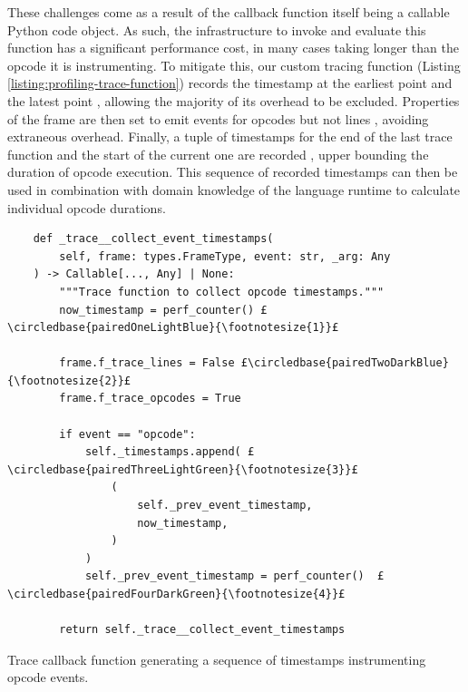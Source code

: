 These challenges come as a result of the callback function itself being a callable Python code object.
As such, the infrastructure to invoke and evaluate this function has a significant performance cost, in many cases taking longer than the opcode it is instrumenting. To mitigate this, our custom tracing function (Listing \ref{listing:profiling-trace-function}) records the timestamp at the earliest point  and the latest point , allowing the majority of its overhead to be excluded. Properties of the frame are then set to emit events for opcodes but not lines , avoiding extraneous overhead. Finally, a tuple of timestamps for the end of the last trace function and the start of the current one are recorded , upper bounding the duration of opcode execution.
This sequence of recorded timestamps can then be used in combination with domain knowledge of the language runtime to calculate individual opcode durations.

\begin{listing}[H]
    \centering
    \begin{verbatim}
    def _trace__collect_event_timestamps(
        self, frame: types.FrameType, event: str, _arg: Any
    ) -> Callable[..., Any] | None:
        """Trace function to collect opcode timestamps."""
        now_timestamp = perf_counter() £\circledbase{pairedOneLightBlue}{\footnotesize{1}}£

        frame.f_trace_lines = False £\circledbase{pairedTwoDarkBlue}{\footnotesize{2}}£
        frame.f_trace_opcodes = True

        if event == "opcode":
            self._timestamps.append( £\circledbase{pairedThreeLightGreen}{\footnotesize{3}}£
                (
                    self._prev_event_timestamp,
                    now_timestamp,
                )
            )
            self._prev_event_timestamp = perf_counter()  £\circledbase{pairedFourDarkGreen}{\footnotesize{4}}£

        return self._trace__collect_event_timestamps
    \end{verbatim}
    \vspace{1em}
    \caption{Trace callback function generating a sequence of timestamps instrumenting opcode events.}
    \label{listing:profiling-trace-function}
\end{listing}


